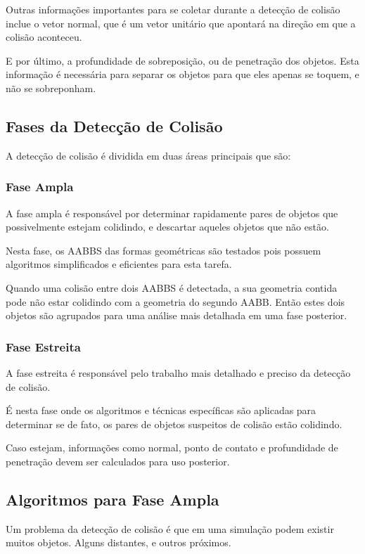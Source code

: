 Outras informações importantes para se coletar durante a detecção de colisão
inclue o vetor normal, que é um vetor unitário que apontará na direção em que a
colisão aconteceu.


E por último, a profundidade de sobreposição, ou de penetração dos objetos.
Esta informação é necessária para separar os objetos para que eles apenas se
toquem, e não se sobreponham.


\subsection{Fases da Detecção de Colisão}

A detecção de colisão é dividida em duas áreas principais que são:

\subsubsection{Fase Ampla}
A fase ampla é responsável por determinar rapidamente pares de objetos que
possivelmente estejam colidindo, e descartar aqueles objetos que não estão.

Nesta fase, os AABBS das formas geométricas são testados pois possuem
algoritmos simplificados e eficientes para esta tarefa.

Quando uma colisão entre dois AABBS é detectada, a sua geometria contida pode
não estar colidindo com a geometria do segundo AABB. Então estes dois objetos
são agrupados para uma análise mais detalhada em uma fase posterior.

\subsubsection{Fase Estreita}
A fase estreita é responsável pelo trabalho mais detalhado e preciso da
detecção de colisão.

É nesta fase onde os algoritmos e técnicas específicas são
aplicadas para determinar se de fato, os pares de objetos suspeitos de colisão
estão colidindo.

Caso estejam, informações como normal, ponto de contato e profundidade de
penetração devem ser calculados para uso posterior.

\subsection{Algoritmos para Fase Ampla}
Um problema da detecção de colisão é que em uma simulação podem existir muitos
objetos. Alguns distantes, e outros próximos.


